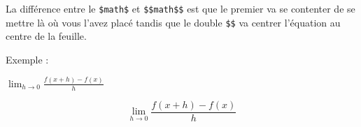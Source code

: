 \documentclass[A4paper
]{article}
\newenvironment{Shaded}{}{}
\newcommand{\SpecialCharTok}[1]{\textcolor[rgb]{0.25,0.44,0.63}{#1}}
\newcommand{\SpecialStringTok}[1]{\textcolor[rgb]{0.73,0.40,0.53}{#1}}
\begin{document}
La différence entre le \texttt{\$math\$} et \texttt{\$\$math\$\$} est
que le premier va se contenter de se mettre là où vous l'avez placé
tandis que le double \texttt{\$\$} va centrer l'équation au centre de la
feuille.

Exemple :

\(\lim_{h \rightarrow 0 } \frac{f(x+h)-f(x)}{h}\)

\[\lim_{h \rightarrow 0 } \frac{f(x+h)-f(x)}{h}\]

\begin{Shaded}
\end{Shaded}
\end{document}
